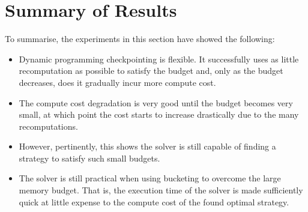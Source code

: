\section{Summary of Results}
To summarise, the experiments in this section have showed the following:
\begin{itemize}
    \item Dynamic programming checkpointing is flexible. It successfully uses as little recomputation as possible to satisfy the budget and, only as the budget decreases, does it gradually incur more compute cost.
    \item The compute cost degradation is very good until the budget becomes very small, at which point the cost starts to increase drastically due to the many recomputations.
    \item However, pertinently, this shows the solver is still capable of finding a strategy to satisfy such small budgets.
    \item The solver is still practical when using bucketing to overcome the large memory budget. That is, the execution time of the solver is made sufficiently quick at little expense to the compute cost of the found optimal strategy.
\end{itemize}
